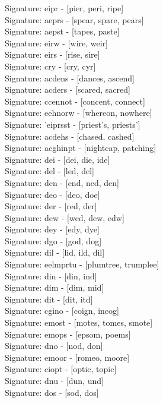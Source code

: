 Signature: {eipr} - [pier, peri, ripe] \\
Signature: {aeprs} - [spear, spare, pears] \\
Signature: {aepst} - [tapes, paste] \\
Signature: {eirw} - [wire, weir] \\
Signature: {eirs} - [rise, sire] \\
Signature: {cry} - [cry, cyr] \\
Signature: {acdens} - [dances, ascend] \\
Signature: {acders} - [scared, sacred] \\
Signature: {ccennot} - [concent, connect] \\
Signature: {eehnorw} - [whereon, nowhere] \\
Signature: {'eiprsst} - [priest's, priests'] \\
Signature: {acdehs} - [chased, cashed] \\
Signature: {acghinpt} - [nightcap, patching] \\
Signature: {dei} - [dei, die, ide] \\
Signature: {del} - [led, del] \\
Signature: {den} - [end, ned, den] \\
Signature: {deo} - [deo, doe] \\
Signature: {der} - [red, der] \\
Signature: {dew} - [wed, dew, edw] \\
Signature: {dey} - [edy, dye] \\
Signature: {dgo} - [god, dog] \\
Signature: {dil} - [lid, ild, dil] \\
Signature: {eelmprtu} - [plumtree, trumplee] \\
Signature: {din} - [din, ind] \\
Signature: {dim} - [dim, mid] \\
Signature: {dit} - [dit, itd] \\
Signature: {cgino} - [coign, incog] \\
Signature: {emost} - [motes, tomes, smote] \\
Signature: {emops} - [epsom, poems] \\
Signature: {dno} - [nod, don] \\
Signature: {emoor} - [romeo, moore] \\
Signature: {ciopt} - [optic, topic] \\
Signature: {dnu} - [dun, und] \\
Signature: {dos} - [sod, dos] \\
